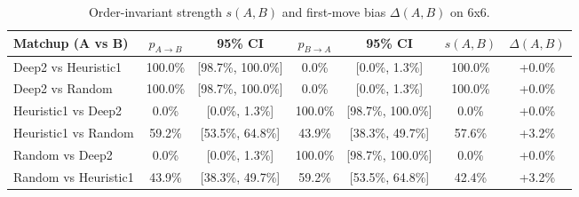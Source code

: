 \begin{table}
\caption{Order-invariant strength $s(A,B)$ and first-move bias $\Delta(A,B)$ on 6x6.}
\label{tab:order_summary_6x6}
\begin{tabular}{lcccccc}
\toprule
Matchup (A vs B) & $p_{A\to B}$ & 95\% CI & $p_{B\to A}$ & 95\% CI & $s(A,B)$ & $\Delta(A,B)$ \\
\midrule
Deep2 vs Heuristic1 & 100.0\% & [98.7\%, 100.0\%] & 0.0\% & [0.0\%, 1.3\%] & 100.0\% & +0.0\% \\
Deep2 vs Random & 100.0\% & [98.7\%, 100.0\%] & 0.0\% & [0.0\%, 1.3\%] & 100.0\% & +0.0\% \\
Heuristic1 vs Deep2 & 0.0\% & [0.0\%, 1.3\%] & 100.0\% & [98.7\%, 100.0\%] & 0.0\% & +0.0\% \\
Heuristic1 vs Random & 59.2\% & [53.5\%, 64.8\%] & 43.9\% & [38.3\%, 49.7\%] & 57.6\% & +3.2\% \\
Random vs Deep2 & 0.0\% & [0.0\%, 1.3\%] & 100.0\% & [98.7\%, 100.0\%] & 0.0\% & +0.0\% \\
Random vs Heuristic1 & 43.9\% & [38.3\%, 49.7\%] & 59.2\% & [53.5\%, 64.8\%] & 42.4\% & +3.2\% \\
\bottomrule
\end{tabular}
\end{table}
